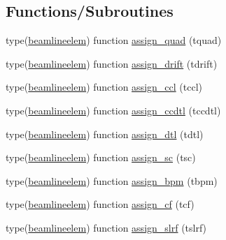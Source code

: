 \subsection*{Functions/\+Subroutines}
\begin{DoxyCompactItemize}
\item 
type(\mbox{\hyperlink{namespacebeamlineelemclass_structbeamlineelemclass_1_1beamlineelem}{beamlineelem}}) function \mbox{\hyperlink{namespacebeamlineelemclass_aad515fd3f566490d835b1d406b23ea12}{assign\+\_\+quad}} (tquad)
\item 
type(\mbox{\hyperlink{namespacebeamlineelemclass_structbeamlineelemclass_1_1beamlineelem}{beamlineelem}}) function \mbox{\hyperlink{namespacebeamlineelemclass_a667b68ced2d4a0e5cd691d7d472a59ae}{assign\+\_\+drift}} (tdrift)
\item 
type(\mbox{\hyperlink{namespacebeamlineelemclass_structbeamlineelemclass_1_1beamlineelem}{beamlineelem}}) function \mbox{\hyperlink{namespacebeamlineelemclass_ac9b767ca614ed15fb347d385e982ef0d}{assign\+\_\+ccl}} (tccl)
\item 
type(\mbox{\hyperlink{namespacebeamlineelemclass_structbeamlineelemclass_1_1beamlineelem}{beamlineelem}}) function \mbox{\hyperlink{namespacebeamlineelemclass_a729afda498a0fcdb5c6625258a745a94}{assign\+\_\+ccdtl}} (tccdtl)
\item 
type(\mbox{\hyperlink{namespacebeamlineelemclass_structbeamlineelemclass_1_1beamlineelem}{beamlineelem}}) function \mbox{\hyperlink{namespacebeamlineelemclass_a56b55ab902212809615ff965f7e6591d}{assign\+\_\+dtl}} (tdtl)
\item 
type(\mbox{\hyperlink{namespacebeamlineelemclass_structbeamlineelemclass_1_1beamlineelem}{beamlineelem}}) function \mbox{\hyperlink{namespacebeamlineelemclass_a1e66e5399a7d4fc6fcfba7e3877f8d2e}{assign\+\_\+sc}} (tsc)
\item 
type(\mbox{\hyperlink{namespacebeamlineelemclass_structbeamlineelemclass_1_1beamlineelem}{beamlineelem}}) function \mbox{\hyperlink{namespacebeamlineelemclass_a078ba2f100d1ff9fe51c4ff957e30897}{assign\+\_\+bpm}} (tbpm)
\item 
type(\mbox{\hyperlink{namespacebeamlineelemclass_structbeamlineelemclass_1_1beamlineelem}{beamlineelem}}) function \mbox{\hyperlink{namespacebeamlineelemclass_ab5db1ddb5dbca2a72ab8efde22f2f90d}{assign\+\_\+cf}} (tcf)
\item 
type(\mbox{\hyperlink{namespacebeamlineelemclass_structbeamlineelemclass_1_1beamlineelem}{beamlineelem}}) function \mbox{\hyperlink{namespacebeamlineelemclass_a2ab33d7e54bdcb16b1f080eda6e520f2}{assign\+\_\+slrf}} (tslrf)

\end{DoxyCompactItemize}
